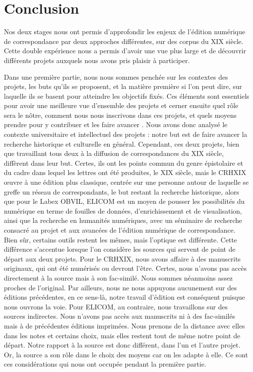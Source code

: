 \part*{Conclusion}

Nos deux stages nous ont permis d'approfondir les enjeux de l'édition numérique de correspondance par deux approches différentes, sur des corpus du XIX siècle. Cette double expérience nous a permis d'avoir une vue plus large et de découvrir différents projets auxquels nous avons pris plaisir à participer.

Dans une première partie, nous nous sommes penchée sur les contextes des projets, les buts qu'ils se proposent, et la matière première si l'on peut dire, sur laquelle ils se basent pour atteindre les objectifs fixés. Ces éléments sont essentiels pour avoir une meilleure vue d'ensemble des projets et cerner ensuite quel rôle sera le nôtre, comment nous nous inscrivons dans ces projets, et quels moyens prendre pour y contribuer et les faire avancer .
Nous avons donc analysé le contexte universitaire et intellectuel des projets : notre but est de faire avancer la recherche historique et culturelle en général. Cependant, ces deux projets, bien que travaillant tous deux à la diffusion de correspondances du XIX siècle, diffèrent dans leur but. Certes, ils ont les points commun du genre épistolaire et du cadre dans lequel les lettres ont été produites, le XIX siècle, mais le CRHXIX \oe uvre à une édition plus classique, centrée sur une personne autour de laquelle se greffe un réseau de correspondants, le but restant la recherche historique, alors que pour le Labex OBVIL, ELICOM est un moyen de pousser les possibilités du numérique en terme de fouilles de données, d'enrichissement et de visualisation, ainsi que la recherche en humanités numériques, avec un séminaire de recherche consacré au projet et aux avancées de l'édition numérique de correspondance.
Bien sûr, certains outils restent les mêmes, mais l'optique est différente.
Cette différence s'accentue lorsque l'on considère les sources qui servent de point de départ aux deux projets. Pour le CRHXIX, nous avons affaire à des manuscrits originaux, qui ont été numérisés ou devront l'être.
Certes, nous n'avons pas accès directement à la source mais à son fac-similé. Nous sommes néanmoins assez proches de l'original.
Par ailleurs, nous ne nous appuyons aucunement sur des éditions précédentes, en ce sens-là, notre travail d'édition est conséquent puisque nous ouvrons la voie. Pour ELICOM, au contraire, nous travaillons sur des sources indirectes. Nous n'avons pas accès aux manuscrits ni à des fac-similés mais à de précédentes éditions imprimées. Nous prenons de la distance avec elles dans les notes et certains choix, mais elles restent tout de même notre point de départ. Notre rapport à la source est donc différent, dans l'un et l'autre projet. Or, la source a son rôle dans le choix des moyens car on les adapte à elle. Ce sont ces considérations qui nous ont occupée pendant la première partie. 

